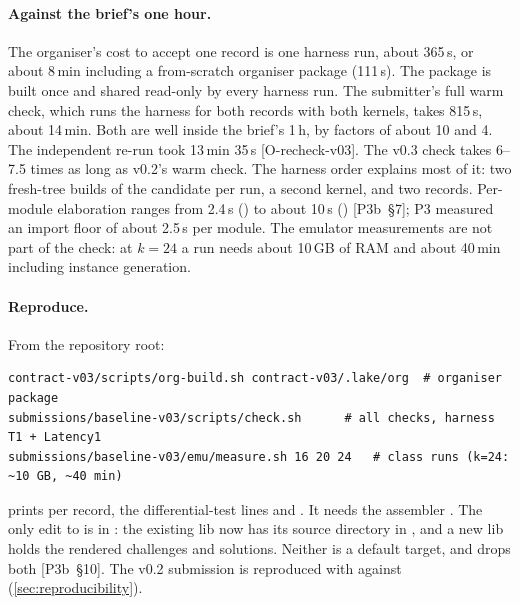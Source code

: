 \paragraph{Against the brief's one hour.} The organiser's cost to accept one record is one harness
run, about 365\,s, or about 8\,min including a from-scratch organiser package (111\,s). The package is
built once and shared read-only by every harness run. The submitter's full warm check, which runs the harness
for both records with both kernels, takes 815\,s, about 14\,min. Both are well inside the brief's
1\,h, by factors of about 10 and 4. The independent re-run took 13\,min 35\,s [O-recheck-v03]. The v0.3 check takes 6--7.5 times as long as v0.2's warm check. The harness
order explains most of it: two fresh-tree builds of the candidate per run, a second kernel, and two
records. Per-module elaboration ranges from 2.4\,s () to about 10\,s ()
[P3b~§7]; P3 measured an import floor of about 2.5\,s per module. The emulator measurements are not part of
the check: at $k=24$ a run needs about 10\,GB of RAM and about 40\,min including instance generation.

\paragraph{Reproduce.} From the repository root:
\begin{Verbatim}[fontsize=\small,frame=single,framerule=0.3pt,rulecolor=\color{black!30},framesep=4pt]
contract-v03/scripts/org-build.sh contract-v03/.lake/org  # organiser package
submissions/baseline-v03/scripts/check.sh      # all checks, harness T1 + Latency1
submissions/baseline-v03/emu/measure.sh 16 20 24   # class runs (k=24: ~10 GB, ~40 min)
\end{Verbatim}
 prints  per record, the differential-test  lines and
. It needs the assembler . The only edit to
 is in : the existing  lib now
has its source directory in , and a new lib
 holds the rendered challenges and solutions. Neither is a default
target, and  drops both [P3b~§10]. The v0.2 submission is reproduced with
 against  (\cref{sec:reproducibility}).

